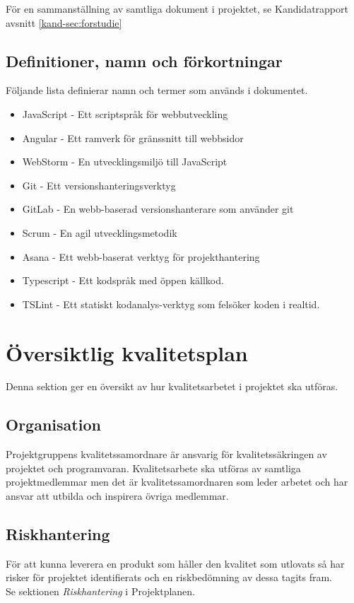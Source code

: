 \documentclass[a4paper,10pt]{article}
\begin{document}
För en sammanställning av samtliga dokument i projektet, se Kandidatrapport avsnitt \ref{kand-sec:forstudie}
\subsection{Definitioner, namn och förkortningar}
Följande lista definierar namn och termer som används i dokumentet.
\begin{itemize}
    \item JavaScript - Ett scriptspråk för webbutveckling
    \item Angular - Ett ramverk för gränssnitt till webbsidor
    \item WebStorm - En utvecklingsmiljö till JavaScript
    \item Git - Ett versionshanteringsverktyg
    \item GitLab - En webb-baserad versionshanterare som använder git
    \item Scrum - En agil utvecklingsmetodik
    \item Asana - Ett webb-baserat verktyg för projekthantering
    \item Typescript - Ett kodspråk med öppen källkod.
    \item TSLint - Ett statiskt kodanalys-verktyg som felsöker koden i realtid.
\end{itemize}

\section{Översiktlig kvalitetsplan}
Denna sektion ger en översikt av hur kvalitetsarbetet i projektet ska utföras.

\subsection{Organisation}

Projektgruppens kvalitetssamordnare är ansvarig för kvalitetssäkringen av projektet och  programvaran. Kvalitetsarbete ska utföras av samtliga projektmedlemmar men det är kvalitetssamordnaren som leder arbetet och har ansvar att utbilda och inspirera övriga medlemmar.

\subsection{Riskhantering}

För att kunna leverera en produkt som håller den kvalitet som utlovats så har risker för projektet identifierats och en riskbedömning av dessa tagits fram. \\
Se sektionen \emph{Riskhantering} i Projektplanen.
\end{document}

